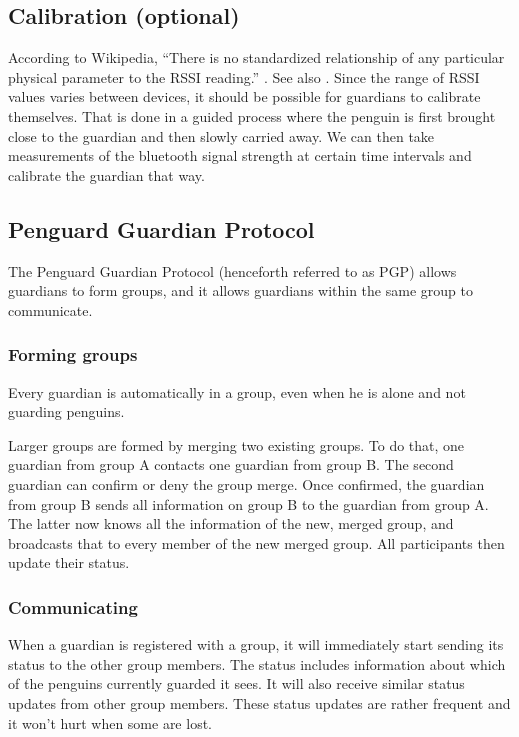 \documentclass{report}
\begin{document}
\subsection{Calibration (optional)}

According to Wikipedia, ``There is no standardized relationship of any particular physical parameter to the RSSI reading.'' \cite{rssi_varies_wiki}. See also \cite{rssi_varies_article}. Since the range of RSSI values varies between devices, it should be possible for guardians to calibrate themselves. That is done in a guided process where the penguin is first brought close to the guardian and then slowly carried away. We can then take measurements of the bluetooth signal strength at certain time intervals and calibrate the guardian that way.

\subsection{Penguard Guardian Protocol}

The Penguard Guardian Protocol (henceforth referred to as PGP) allows guardians to form groups, and it allows guardians within the same group to communicate.

\subsubsection{Forming groups}

Every guardian is automatically in a group, even when he is alone and not guarding penguins.

Larger groups are formed by merging two existing groups. To do that, one guardian from group A contacts one guardian from group B. The second guardian can confirm or deny the group merge. Once confirmed, the guardian from group B sends all information on group B to the guardian from group A. The latter now knows all the information of the new, merged group, and broadcasts that to every member of the new merged group. All participants then update their status.

\subsubsection{Communicating}

When a guardian is registered with a group, it will immediately start sending its status to the other group members. The status includes information about which of the penguins currently guarded it sees. It will also receive similar status updates from other group members. These status updates are rather frequent and it won't hurt when some are lost.
\end{document}
